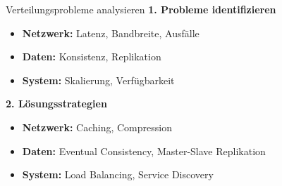 \begin{KR}{Verteilungsprobleme analysieren}
\textbf{1. Probleme identifizieren}
\begin{itemize}
    \item \textbf{Netzwerk:} Latenz, Bandbreite, Ausfälle
    \item \textbf{Daten:} Konsistenz, Replikation
    \item \textbf{System:} Skalierung, Verfügbarkeit
\end{itemize}

\textbf{2. Lösungsstrategien}
\begin{itemize}
    \item \textbf{Netzwerk:} Caching, Compression
    \item \textbf{Daten:} Eventual Consistency, Master-Slave Replikation
    \item \textbf{System:} Load Balancing, Service Discovery
\end{itemize}
\end{KR}

